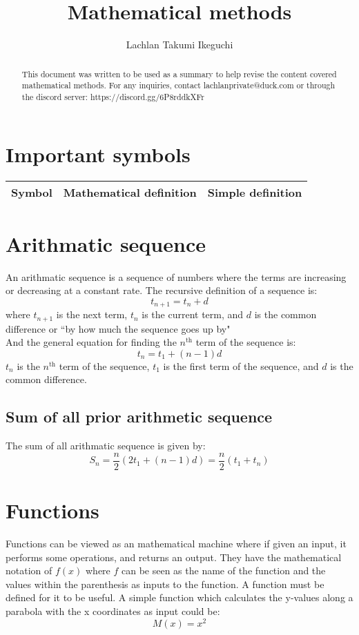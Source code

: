 \documentclass[a4paper,10pt]{report}
\title{Mathematical methods}
\author{Lachlan Takumi Ikeguchi}
\begin{document}
\maketitle
\tableofcontents

\begin{abstract}
	This document was written to be used as a summary to help revise the content covered mathematical methods.  For any inquiries, contact lachlanprivate@duck.com or through the discord server: https://discord.gg/6P8rddkXFr
\end{abstract}

\section{Important symbols}
\begin{center}
	\begin{tabular}{l|lp{6cm}}
		Symbol & Mathematical definition & Simple definition \\ \hline
	\end{tabular}
\end{center}

\pagebreak

\section{Arithmatic sequence}
An arithmatic sequence is a sequence of numbers where the terms are increasing or decreasing at a constant rate.  The recursive definition of a sequence is:
$$t_{n + 1} = t_n + d$$
where $t_{n + 1}$ is the next term, $t_n$ is the current term, and $d$ is the common difference or ``by how much the sequence goes up by"\\

And the general equation for finding the $n^{\text{th}}$ term of the sequence is:
$$t_n = t_1 + (n - 1)d$$
$t_n$ is the $n^{\text{th}}$ term of the sequence, $t_1$ is the first term of the sequence, and $d$ is the common difference.

\subsection{Sum of all prior arithmetic sequence}
The sum of all arithmatic sequence is given by:
$$S_n = \frac{n}{2}(2t_1 + (n - 1)d) = \frac{n}{2}(t_1 + t_n)$$

\section{Functions}
Functions can be viewed as an mathematical machine where if given an input, it performs some operations, and returns an output.  They have the mathematical notation of $f(x)$ where $f$ can be seen as the name of the function and the values within the parenthesis as inputs to the function.  A function must be defined for it to be useful.  A simple function which calculates the y-values along a parabola with the x coordinates as input could be:
$$M(x) = x^2$$
\end{document}
